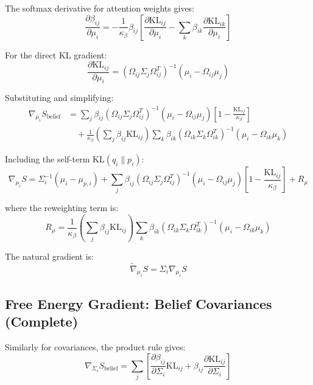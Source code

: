 \documentclass[11pt]{article}
\begin{document}
The softmax derivative for attention weights gives:
\begin{equation}
\frac{\partial \beta_{ij}}{\partial \mu_i} = -\frac{1}{\kappa_\beta} \beta_{ij} \left[\frac{\partial \mathrm{KL}_{ij}}{\partial \mu_i} - \sum_k \beta_{ik} \frac{\partial \mathrm{KL}_{ik}}{\partial \mu_i}\right]
\end{equation}

For the direct KL gradient:
\begin{equation}
\frac{\partial \mathrm{KL}_{ij}}{\partial \mu_i} = (\Omega_{ij}\Sigma_j\Omega_{ij}^T)^{-1}(\mu_i - \Omega_{ij}\mu_j)
\end{equation}

Substituting and simplifying:
\begin{align}
\nabla_{\mu_i} S_{\mathrm{belief}} &= \sum_j \beta_{ij} (\Omega_{ij}\Sigma_j\Omega_{ij}^T)^{-1}(\mu_i - \Omega_{ij}\mu_j) \left[1 - \frac{\mathrm{KL}_{ij}}{\kappa_\beta}\right] \nonumber \\
&\quad + \frac{1}{\kappa_\beta}\left(\sum_j \beta_{ij}\mathrm{KL}_{ij}\right) \sum_k \beta_{ik} (\Omega_{ik}\Sigma_k\Omega_{ik}^T)^{-1}(\mu_i - \Omega_{ik}\mu_k)
\end{align}

Including the self-term $\mathrm{KL}(q_i \| p_i)$:
\begin{equation}
\boxed{\nabla_{\mu_i} S = \Sigma_i^{-1}(\mu_i - \mu_{p,i}) + \sum_j \beta_{ij} (\Omega_{ij}\Sigma_j\Omega_{ij}^T)^{-1}(\mu_i - \Omega_{ij}\mu_j) \left[1 - \frac{\mathrm{KL}_{ij}}{\kappa_\beta}\right] + R_\mu}
\end{equation}

where the reweighting term is:
\begin{equation}
R_\mu = \frac{1}{\kappa_\beta}\left(\sum_j \beta_{ij}\mathrm{KL}_{ij}\right) \sum_k \beta_{ik} (\Omega_{ik}\Sigma_k\Omega_{ik}^T)^{-1}(\mu_i - \Omega_{ik}\mu_k)
\end{equation}

The natural gradient is:
\begin{equation}
\tilde{\nabla}_{\mu_i} S = \Sigma_i \nabla_{\mu_i} S
\end{equation}

\subsection*{Free Energy Gradient: Belief Covariances (Complete)}

Similarly for covariances, the product rule gives:
\begin{equation}
\nabla_{\Sigma_i} S_{\mathrm{belief}} = \sum_j \left[ \frac{\partial \beta_{ij}}{\partial \Sigma_i} \mathrm{KL}_{ij} + \beta_{ij} \frac{\partial \mathrm{KL}_{ij}}{\partial \Sigma_i} \right]
\end{equation}
\end{document}
